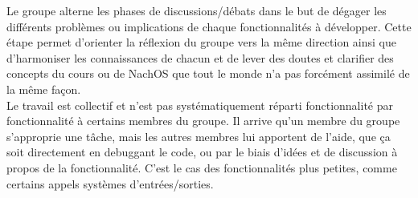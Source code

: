 \documentclass{report}
\begin{document}
Le groupe alterne les phases de discussions/débats dans le but de dégager les différents problèmes ou implications de chaque fonctionnalités à développer. Cette étape permet d'orienter la réflexion du groupe vers la même direction ainsi que d'harmoniser les connaissances de chacun et de lever des doutes et clarifier des concepts du cours ou de NachOS que tout le monde n'a pas forcément assimilé de la même façon.\\

Le travail est collectif et n'est pas systématiquement réparti fonctionnalité par fonctionnalité à certains membres du groupe. Il arrive qu'un membre du groupe s'approprie une tâche, mais les autres membres lui apportent de l'aide, que ça soit directement en debuggant le code, ou par le biais d'idées et de discussion à propos de la fonctionnalité. C'est le cas des fonctionnalités plus petites, comme certains appels systèmes d'entrées/sorties.
\end{document}
